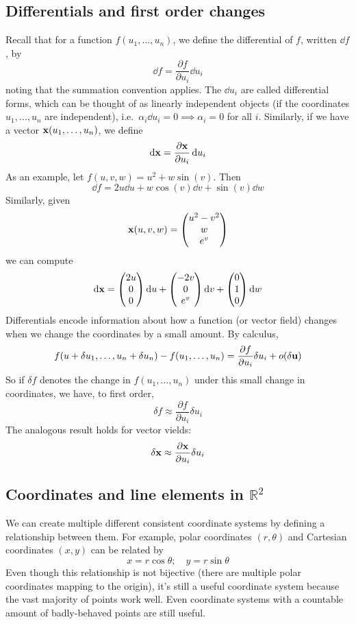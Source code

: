 \subsection{Differentials and first order changes}
Recall that for a function \(f(u_1, \dots, u_n)\), we define the differential of \(f\), written \(\dd{f}\), by
\[
	\dd{f} = \frac{\partial f}{\partial u_i} \dd{u}_i
\]
noting that the summation convention applies.
The \(\dd{u}_i\) are called differential forms, which can be thought of as linearly independent objects (if the coordinates \(u_1, \dots, u_n\) are independent), i.e.\ \(\alpha_i \dd{u}_i = 0 \implies \alpha_i = 0\) for all \(i\).
Similarly, if we have a vector \(\vb x(u_1, \dots, u_n)\), we define
\[
	\dd \vb x = \frac{\partial \vb x}{\partial u_i} \dd{u}_i
\]
As an example, let \(f(u, v, w) = u^2 + w \sin(v)\).
Then
\[
	\dd{f} = 2u \dd{u} + w \cos(v) \dd{v} + \sin(v) \dd{w}
\]
Similarly, given
\[
	\vb x(u, v, w) = \begin{pmatrix}
		u^2 - v^2 \\ w \\ e^v
	\end{pmatrix}
\]
we can compute
\[
	\dd \vb x = \begin{pmatrix}
		2u \\ 0 \\ 0
	\end{pmatrix} \dd{u} + \begin{pmatrix}
		-2v \\ 0 \\ e^v
	\end{pmatrix} \dd{v} + \begin{pmatrix}
		0 \\ 1 \\ 0
	\end{pmatrix} \dd{w}
\]
Differentials encode information about how a function (or vector field) changes when we change the coordinates by a small amount.
By calculus,
\[
	f(u + \delta u_1, \dots, u_n + \delta u_n) - f(u_1, \dots, u_n) = \frac{\partial f}{\partial u_i} \delta u_i + o(\delta \vb u)
\]
So if \(\delta f\) denotes the change in \(f(u_1, \dots, u_n)\) under this small change in coordinates, we have, to first order,
\[
	\delta f \approx \frac{\partial f}{\partial u_i}\delta u_i
\]
The analogous result holds for vector vields:
\[
	\delta \vb x \approx \frac{\partial \vb x}{\partial u_i}\delta u_i
\]

\subsection{Coordinates and line elements in \(\mathbb R^2\)}
We can create multiple different consistent coordinate systems by defining a relationship between them.
For example, polar coordinates \((r, \theta)\) and Cartesian coordinates \((x, y)\) can be related by
\[
	x = r \cos \theta;\quad y = r \sin \theta
\]
Even though this relationship is not bijective (there are multiple polar coordinates mapping to the origin), it's still a useful coordinate system because the vast majority of points work well.
Even coordinate systems with a countable amount of badly-behaved points are still useful.

